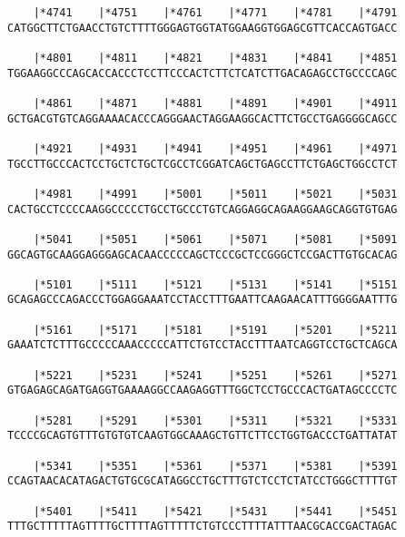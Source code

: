 \documentclass{article}
\begin{document}
\begin{Verbatim}
    |*4741    |*4751    |*4761    |*4771    |*4781    |*4791
CATGGCTTCTGAACCTGTCTTTTGGGAGTGGTATGGAAGGTGGAGCGTTCACCAGTGACC
                                                            
    |*4801    |*4811    |*4821    |*4831    |*4841    |*4851
TGGAAGGCCCAGCACCACCCTCCTTCCCACTCTTCTCATCTTGACAGAGCCTGCCCCAGC
                                                            
    |*4861    |*4871    |*4881    |*4891    |*4901    |*4911
GCTGACGTGTCAGGAAAACACCCAGGGAACTAGGAAGGCACTTCTGCCTGAGGGGCAGCC
                                                            
    |*4921    |*4931    |*4941    |*4951    |*4961    |*4971
TGCCTTGCCCACTCCTGCTCTGCTCGCCTCGGATCAGCTGAGCCTTCTGAGCTGGCCTCT
                                                            
    |*4981    |*4991    |*5001    |*5011    |*5021    |*5031
CACTGCCTCCCCAAGGCCCCCTGCCTGCCCTGTCAGGAGGCAGAAGGAAGCAGGTGTGAG
                                                            
    |*5041    |*5051    |*5061    |*5071    |*5081    |*5091
GGCAGTGCAAGGAGGGAGCACAACCCCCAGCTCCCGCTCCGGGCTCCGACTTGTGCACAG
                                                            
    |*5101    |*5111    |*5121    |*5131    |*5141    |*5151
GCAGAGCCCAGACCCTGGAGGAAATCCTACCTTTGAATTCAAGAACATTTGGGGAATTTG
                                                            
    |*5161    |*5171    |*5181    |*5191    |*5201    |*5211
GAAATCTCTTTGCCCCCAAACCCCCATTCTGTCCTACCTTTAATCAGGTCCTGCTCAGCA
                                                            
    |*5221    |*5231    |*5241    |*5251    |*5261    |*5271
GTGAGAGCAGATGAGGTGAAAAGGCCAAGAGGTTTGGCTCCTGCCCACTGATAGCCCCTC
                                                            
    |*5281    |*5291    |*5301    |*5311    |*5321    |*5331
TCCCCGCAGTGTTTGTGTGTCAAGTGGCAAAGCTGTTCTTCCTGGTGACCCTGATTATAT
                                                            
    |*5341    |*5351    |*5361    |*5371    |*5381    |*5391
CCAGTAACACATAGACTGTGCGCATAGGCCTGCTTTGTCTCCTCTATCCTGGGCTTTTGT
                                                            
    |*5401    |*5411    |*5421    |*5431    |*5441    |*5451
TTTGCTTTTTAGTTTTGCTTTTAGTTTTTCTGTCCCTTTTATTTAACGCACCGACTAGAC
                                                            

\end{Verbatim}
\end{document}

